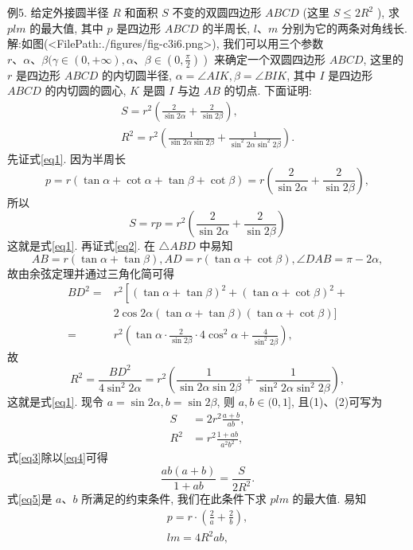 例5. 给定外接圆半径 $R$ 和面积 $S$ 不变的双圆四边形 $A B C D$ (这里 $S \leqslant 2 R^2$ ), 求 $p l m$ 的最大值, 其中 $p$ 是四边形 $A B C D$ 的半周长, $l 、 m$ 分别为它的两条对角线长.
解:如图(<FilePath:./figures/fig-c3i6.png>), 我们可以用三个参数 $r 、 \alpha 、 \beta(\gamma \in(0,+\infty), \alpha 、 \beta \in \left.\left(0, \frac{\pi}{2}\right)\right)$ 来确定一个双圆四边形 $A B C D$, 这里的 $r$ 是四边形 $A B C D$ 的内切圆半径, $\alpha=\angle A I K, \beta=\angle B I K$, 其中 $I$ 是四边形 $A B C D$ 的内切圆的圆心, $K$ 是圆 $I$ 与边 $A B$ 的切点.
下面证明:
$$
\begin{gathered}
S=r^2\left(\frac{2}{\sin 2 \alpha}+\frac{2}{\sin 2 \beta}\right), \label{eq1}\\
R^2=r^2\left(\frac{1}{\sin 2 \alpha \sin 2 \beta}+\frac{1}{\sin ^2 2 \alpha \sin ^2 2 \beta}\right) . \label{eq2}
\end{gathered}
$$
先证式\ref{eq1}. 因为半周长
$$
p=r(\tan \alpha+\cot \alpha+\tan \beta+\cot \beta)=r\left(\frac{2}{\sin 2 \alpha}+\frac{2}{\sin 2 \beta}\right),
$$
所以
$$
S=r p=r^2\left(\frac{2}{\sin 2 \alpha}+\frac{2}{\sin 2 \beta}\right)
$$
这就是式\ref{eq1}.
再证式\ref{eq2}. 在 $\triangle A B D$ 中易知
$$
A B=r(\tan \alpha+\tan \beta), A D=r(\tan \alpha+\cot \beta), \angle D A B=\pi-2 \alpha,
$$
故由余弦定理并通过三角化简可得
$$
\begin{aligned}
B D^2= & r^2\left[(\tan \alpha+\tan \beta)^2+(\tan \alpha+\cot \beta)^2+\right. \\
& 2 \cos 2 \alpha(\tan \alpha+\tan \beta)(\tan \alpha+\cot \beta)] \\
= & r^2\left(\tan \alpha \cdot \frac{2}{\sin 2 \beta} \cdot 4 \cos ^2 \alpha+\frac{4}{\sin ^2 2 \beta}\right),
\end{aligned}
$$
故
$$
R^2=\frac{B D^2}{4 \sin ^2 2 \alpha}=r^2\left(\frac{1}{\sin 2 \alpha \sin 2 \beta}+\frac{1}{\sin ^2 2 \alpha \sin ^2 2 \beta}\right),
$$
这就是式\ref{eq1}.
现令 $a=\sin 2 \alpha, b=\sin 2 \beta$, 则 $a, b \in(0,1]$, 且(1)、(2)可写为
$$
\begin{aligned}
S & =2 r^2 \frac{a+b}{a b}, \label{eq3}\\
R^2 & =r^2 \frac{1+a b}{a^2 b^2}, \label{eq4}
\end{aligned}
$$
式\ref{eq3}除以\ref{eq4}可得
$$
\frac{a b(a+b)}{1+a b}=\frac{S}{2 R^2} . \label{eq5}
$$
式\ref{eq5}是 $a 、 b$ 所满足的约束条件, 我们在此条件下求 $p l m$ 的最大值.
易知
$$
\begin{gathered}
p=r \cdot\left(\frac{2}{a}+\frac{2}{b}\right), \\
l m=4 R^2 a b,
\end{gathered}
$$
